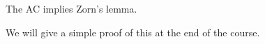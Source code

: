 \documentclass{whrartcl}
\newcommand{\uh}{\upharpoonright}
\newcommand{\TODO}[1]{{\color{red}[TODO: #1]}}
\begin{document}
\begin{theorem}
  The AC implies Zorn's lemma.
\end{theorem}
\begin{remark}
  We will give a simple proof of this at the end of the course.
\end{remark}
%
\end{document}
